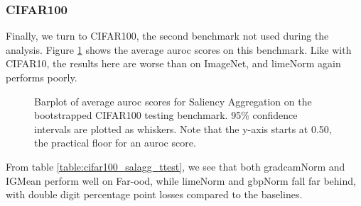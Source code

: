 \documentclass[UKenglish]{uiomasterthesis} %
\theoremstyle{definition}
\begin{document}
\newpage

\subsubsection{CIFAR100}

Finally, we turn to CIFAR100, the second benchmark not used during the analysis. Figure \ref{fig:cifar100_salagg_bootstrap_barplot} shows the average \ac{auroc} scores on this benchmark. Like with CIFAR10, the results here are worse than on ImageNet, and \ac{lime}Norm again performs poorly.

\begin{figure}[hbtp]
    \begin{center}
        
    \end{center}
    \caption[CIFAR100 Saliency Aggregation Bootstrap]{Barplot of average \ac{auroc} scores for Saliency Aggregation on the bootstrapped CIFAR100 testing benchmark. 95\% confidence intervals are plotted as whiskers. Note that the y-axis starts at 0.50, the practical floor for an \ac{auroc} score.}
    \label{fig:cifar100_salagg_bootstrap_barplot}
\end{figure}

From table \ref{table:cifar100_salagg_ttest}, we see that both \ac{gradcam}Norm and IGMean perform well on Far-\ac{ood}, while \ac{lime}Norm and \ac{gbp}Norm fall far behind, with double digit percentage point losses compared to the baselines.
\end{document}
